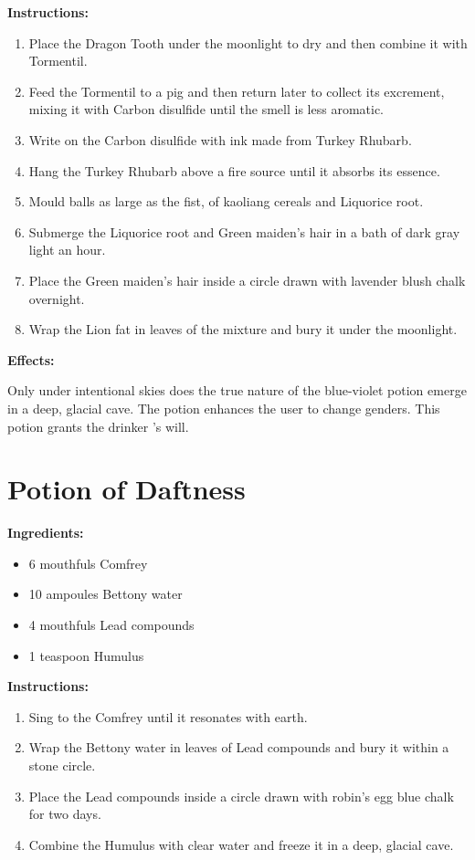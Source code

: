 \documentclass{article}
\begin{document}
\textbf{Instructions:}

\begin{enumerate}
  \item Place the Dragon Tooth under the moonlight to dry and then combine it with Tormentil.
  \item Feed the Tormentil to a pig and then return later to collect its excrement, mixing it with Carbon disulfide until the smell is less aromatic.
  \item Write on the Carbon disulfide with ink made from Turkey Rhubarb.
  \item Hang the Turkey Rhubarb above a fire source until it absorbs its essence.
  \item Mould balls as large as the fist, of kaoliang cereals and Liquorice root.
  \item Submerge the Liquorice root and Green maiden's hair in a bath of dark gray light an hour.
  \item Place the Green maiden's hair inside a circle drawn with lavender blush chalk overnight.
  \item Wrap the Lion fat in leaves of the mixture and bury it under the moonlight.
\end{enumerate}

\textbf{Effects:}

Only under intentional skies does the true nature of the blue-violet potion emerge in a deep, glacial cave. The potion enhances the user to change genders. This potion grants the drinker 's will.

\newpage
\section*{Potion of Daftness}

\textbf{Ingredients:}

\begin{itemize}
  \item 6 mouthfuls Comfrey
  \item 10 ampoules Bettony water
  \item 4 mouthfuls Lead compounds
  \item 1 teaspoon Humulus
\end{itemize}

\textbf{Instructions:}

\begin{enumerate}
  \item Sing to the Comfrey until it resonates with earth.
  \item Wrap the Bettony water in leaves of Lead compounds and bury it within a stone circle.
  \item Place the Lead compounds inside a circle drawn with robin's egg blue chalk for two days.
  \item Combine the Humulus with clear water and freeze it in a deep, glacial cave.
\end{enumerate}
\end{document}
